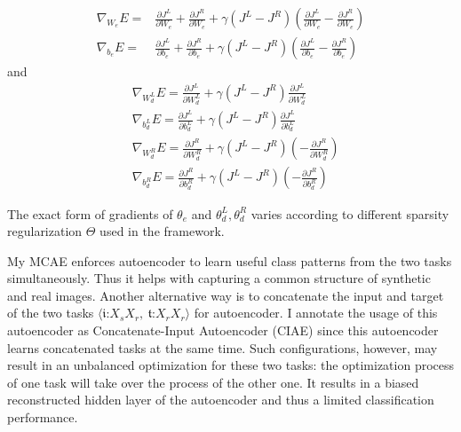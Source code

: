 \documentclass{iitthesis}
\begin{document}
\begin{equation}
\begin{split}\nabla_{W_{e}}E= & \frac{\partial{J^{L}}}{\partial{W_{e}}}+\frac{\partial{J^{R}}}{\partial{W_{e}}}+\gamma(J^{L}-J^{R})(\frac{\partial{J^{L}}}{\partial{W_{e}}}-\frac{\partial{J^{R}}}{\partial{W_{e}}})\\
\nabla_{b_{e}}E= & \frac{\partial{J^{L}}}{\partial{b_{e}}}+\frac{\partial{J^{R}}}{\partial{b_{e}}}+\gamma(J^{L}-J^{R})(\frac{\partial{J^{L}}}{\partial{b_{e}}}-\frac{\partial{J^{R}}}{\partial{b_{e}}})
\end{split}
\end{equation}
and 
\begin{equation}
\begin{split} & \nabla_{W_{d}^{L}}E=\frac{\partial{J^{L}}}{\partial{W_{d}^{L}}}+\gamma(J^{L}-J^{R})\frac{\partial{J^{L}}}{\partial{W_{d}^{L}}}\\
 & \nabla_{b_{d}^{L}}E=\frac{\partial{J^{L}}}{\partial{b_{d}^{L}}}+\gamma(J^{L}-J^{R})\frac{\partial{J^{L}}}{\partial{b_{d}^{L}}}\\
 & \nabla_{W_{d}^{R}}E=\frac{\partial{J^{R}}}{\partial{W_{d}^{R}}}+\gamma(J^{L}-J^{R})(-\frac{\partial{J^{R}}}{\partial{W_{d}^{R}}})\\
 & \nabla_{b_{d}^{R}}E=\frac{\partial{J^{R}}}{\partial{b_{d}^{R}}}+\gamma(J^{L}-J^{R})(-\frac{\partial{J^{R}}}{\partial{b_{d}^{R}}})
\end{split}
\end{equation}


The exact form of gradients of $\theta_{e}$ and $\theta_{d}^{L},\theta_{d}^{R}$ varies according to different sparsity regularization $\Theta$ used in the framework.

 My MCAE enforces autoencoder to learn useful class patterns from the two tasks simultaneously. Thus it helps with capturing a common structure of synthetic and real images. Another alternative way is to concatenate the input and target of the two tasks $\langle\mathfrak{i}\text{:}X_{s}X_{r},\:\mathfrak{t}\text{:}X_{r}X_{r}\rangle$ for autoencoder. I annotate the usage of this autoencoder as Concatenate-Input Autoencoder (CIAE) since this autoencoder learns concatenated tasks at the same time. Such configurations, however, may result in an unbalanced optimization for these two tasks: the optimization process of one task will take over the process of the other one. It results in a biased reconstructed hidden layer of the autoencoder and thus a limited classification performance.
\end{document}
